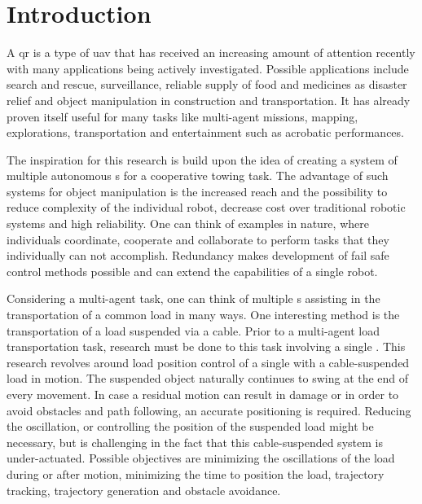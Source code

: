 \chapter{Introduction} \label{ch:intro}
A \acf{qr} is a type of \acf*{uav} that has received an increasing amount of attention recently with many applications being actively investigated. Possible applications include search and rescue, surveillance, reliable supply of food and medicines as disaster relief and object manipulation in construction and transportation. It has already proven itself useful for many tasks like multi-agent missions, mapping, explorations, transportation and entertainment such as acrobatic performances.

The inspiration for this research is build upon the idea of creating a system of multiple autonomous s for a cooperative towing task. The advantage of such systems for object manipulation is the increased reach and the possibility to reduce complexity of the individual robot, decrease cost over traditional robotic systems and high reliability. One can think of examples in nature, where individuals coordinate, cooperate and collaborate to perform tasks that they individually can not accomplish. Redundancy makes development of fail safe control methods possible and can extend the capabilities of a single robot. 						

Considering a multi-agent task, one can think of multiple s assisting in the transportation of a common load in many ways.
One interesting method is the transportation of a load suspended via a cable.
Prior to a multi-agent load transportation task, research must be done to this task involving a single .
This research revolves around load position control of a single  with a cable-suspended load in motion. 
The suspended object naturally continues to swing at the end of every movement. In case a residual motion can result in damage or in order to avoid obstacles and path following, an accurate positioning is required. Reducing the oscillation, or controlling the position of the suspended load might be necessary, but is challenging in the fact that this cable-suspended system is under-actuated. Possible objectives are minimizing the oscillations of the load during or after motion, minimizing the time to position the load, trajectory tracking, trajectory generation and obstacle avoidance.

\newpage
